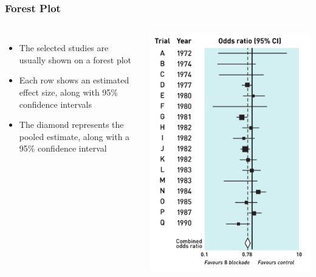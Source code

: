 \documentclass[10pt, block=fill]{beamer}
\begin{document}
\begin{frame}
    \frametitle{Forest Plot}
    
    \begin{columns}
    \begin{itemize}
        \item The selected studies are usually shown on a forest plot
        \item Each row shows an estimated effect size, along with 95\% confidence intervals
        \item The diamond represents the pooled estimate, along with a 95\% confidence interval
    \end{itemize}
        
    \includegraphics[width=0.9\linewidth]{figures/forest_plot.png}

    \end{columns}
    
\end{frame}
\end{document}
